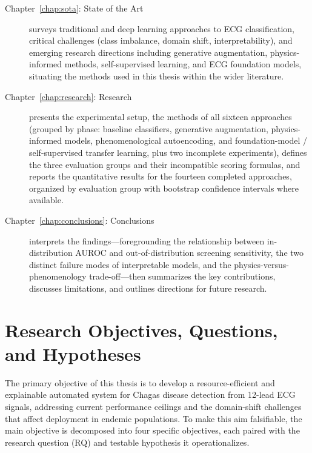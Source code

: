 \begin{description}
    \item[Chapter~\ref{chap:sota}: State of the Art] surveys traditional and deep learning approaches to ECG classification, critical challenges (class imbalance, domain shift, interpretability), and emerging research directions including generative augmentation, physics-informed methods, self-supervised learning, and ECG foundation models, situating the methods used in this thesis within the wider literature.

    \item[Chapter~\ref{chap:research}: Research] presents the experimental setup, the methods of all sixteen approaches (grouped by phase: baseline classifiers, generative augmentation, physics-informed models, phenomenological autoencoding, and foundation-model / self-supervised transfer learning, plus two incomplete experiments), defines the three evaluation groups and their incompatible scoring formulas, and reports the quantitative results for the fourteen completed approaches, organized by evaluation group with bootstrap confidence intervals where available.

    \item[Chapter~\ref{chap:conclusions}: Conclusions] interprets the findings---foregrounding the relationship between in-distribution AUROC and out-of-distribution screening sensitivity, the two distinct failure modes of interpretable models, and the physics-versus-phenomenology trade-off---then summarizes the key contributions, discusses limitations, and outlines directions for future research.
\end{description}


\section{Research Objectives, Questions, and Hypotheses}
\label{sec:objectives}

The primary objective of this thesis is to develop a resource-efficient and explainable automated system for Chagas disease detection from 12-lead ECG signals, addressing current performance ceilings and the domain-shift challenges that affect deployment in endemic populations. To make this aim falsifiable, the main objective is decomposed into four specific objectives, each paired with the research question (RQ) and testable hypothesis it operationalizes.

